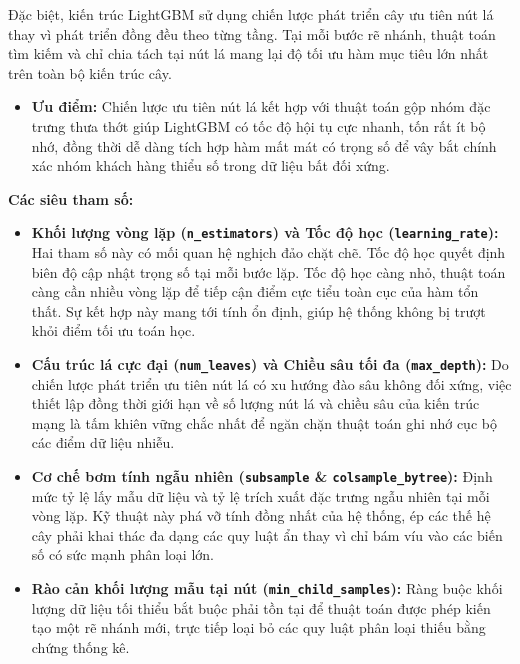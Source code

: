 \documentclass[a4paper,11pt]{article}
\begin{document}
Đặc biệt, kiến trúc LightGBM sử dụng chiến lược phát triển cây ưu tiên nút lá thay vì phát triển đồng đều theo từng tầng. Tại mỗi bước rẽ nhánh, thuật toán tìm kiếm và chỉ chia tách tại nút lá mang lại độ tối ưu hàm mục tiêu lớn nhất trên toàn bộ kiến trúc cây. 
\begin{itemize}
    \item \textbf{Ưu điểm:} Chiến lược ưu tiên nút lá kết hợp với thuật toán gộp nhóm đặc trưng thưa thớt giúp LightGBM có tốc độ hội tụ cực nhanh, tốn rất ít bộ nhớ, đồng thời dễ dàng tích hợp hàm mất mát có trọng số để vây bắt chính xác nhóm khách hàng thiểu số trong dữ liệu bất đối xứng.
\end{itemize}
\textbf{Các siêu tham số:}
\begin{itemize}[itemsep=4pt, leftmargin=*]
    \item \textbf{Khối lượng vòng lặp (\texttt{n\_estimators}) và Tốc độ học (\texttt{learning\_rate}):} Hai tham số này có mối quan hệ nghịch đảo chặt chẽ. Tốc độ học quyết định biên độ cập nhật trọng số tại mỗi bước lặp. Tốc độ học càng nhỏ, thuật toán càng cần nhiều vòng lặp để tiếp cận điểm cực tiểu toàn cục của hàm tổn thất. Sự kết hợp này mang tới tính ổn định, giúp hệ thống không bị trượt khỏi điểm tối ưu toán học.
    
    \item \textbf{Cấu trúc lá cực đại (\texttt{num\_leaves}) và Chiều sâu tối đa (\texttt{max\_depth}):} Do chiến lược phát triển ưu tiên nút lá có xu hướng đào sâu không đối xứng, việc thiết lập đồng thời giới hạn về số lượng nút lá và chiều sâu của kiến trúc mạng là tấm khiên vững chắc nhất để ngăn chặn thuật toán ghi nhớ cục bộ các điểm dữ liệu nhiễu.
    
    \item \textbf{Cơ chế bơm tính ngẫu nhiên (\texttt{subsample} \& \texttt{colsample\_bytree}):} Định mức tỷ lệ lấy mẫu dữ liệu và tỷ lệ trích xuất đặc trưng ngẫu nhiên tại mỗi vòng lặp. Kỹ thuật này phá vỡ tính đồng nhất của hệ thống, ép các thế hệ cây phải khai thác đa dạng các quy luật ẩn thay vì chỉ bám víu vào các biến số có sức mạnh phân loại lớn.
    
    \item \textbf{Rào cản khối lượng mẫu tại nút (\texttt{min\_child\_samples}):} Ràng buộc khối lượng dữ liệu tối thiểu bắt buộc phải tồn tại để thuật toán được phép kiến tạo một rẽ nhánh mới, trực tiếp loại bỏ các quy luật phân loại thiếu bằng chứng thống kê.
\end{itemize}
\end{document}
